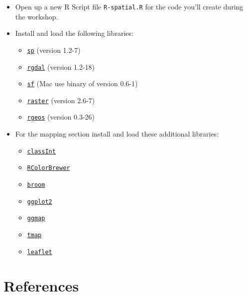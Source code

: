 \documentclass[]{book}
\providecommand{\tightlist}{%
  \setlength{\itemsep}{0pt}\setlength{\parskip}{0pt}}
\theoremstyle{definition}
\theoremstyle{definition}
\theoremstyle{definition}
\theoremstyle{remark}
\begin{document}
\begin{itemize}
\item
  Open up a new R Script file \texttt{R-spatial.R} for the code you'll
  create during the workshop.
\item
  Install and load the following libraries:

  \begin{itemize}
  \tightlist
  \item
    \href{https://CRAN.R-project.org/package=sp}{\texttt{sp}} (version
    1.2-7)
  \item
    \href{https://CRAN.R-project.org/package=rgdal}{\texttt{rgdal}}
    (version 1.2-18)
  \item
    \href{https://cran.r-project.org/package=sf}{\texttt{sf}} (Mac use
    binary of version 0.6-1)
  \item
    \href{https://CRAN.R-project.org/package=raster}{\texttt{raster}}
    (version 2.6-7)
  \item
    \href{https://CRAN.R-project.org/package=rgeos}{\texttt{rgeos}}
    (version 0.3-26)
  \end{itemize}
\item
  For the mapping section install and load these additional libraries:

  \begin{itemize}
  \tightlist
  \item
    \href{https://cran.r-project.org/package=classInt}{\texttt{classInt}}
  \item
    \href{https://cran.r-project.org/package=RColorBrewer}{\texttt{RColorBrewer}}
  \item
    \href{https://cran.r-project.org/package=broom}{\texttt{broom}}
  \item
    \href{https://cran.r-project.org/package=ggplot2}{\texttt{ggplot2}}
  \item
    \href{https://cran.r-project.org/package=ggmap}{\texttt{ggmap}}
  \item
    \href{https://cran.r-project.org/package=tmap}{\texttt{tmap}}
  \item
    \href{https://cran.r-project.org/package=leaflet}{\texttt{leaflet}}
  \end{itemize}
\end{itemize}

\section*{References}\label{references}
\end{document}
